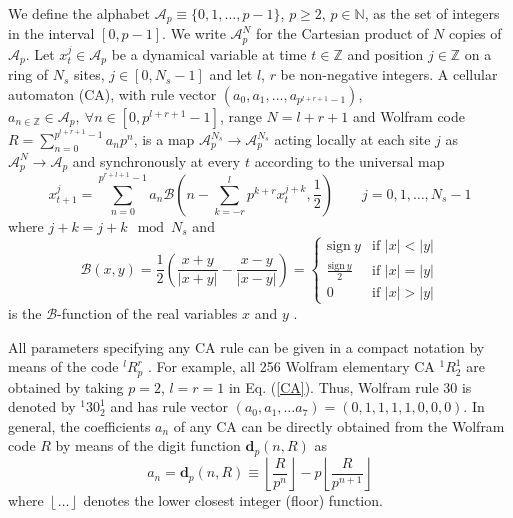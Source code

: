 \documentclass[aps,pre,preprint,floatfix]{revtex4}
\theoremstyle{plain} \newtheorem{defi}{Definition}[section]
\theoremstyle{plain} \newtheorem{prop}{Proposition}[section]
\theoremstyle{plain} \newtheorem{theor}{Theorem}[section]
\theoremstyle{plain} \newtheorem{lemma}{Lemma}[section]
\theoremstyle{plain} \newtheorem*{corol}{Corollary}
\theoremstyle{remark} \newtheorem*{rem}{Remark}
\theoremstyle{plain} \newtheorem{exer}{Exercise}[section]
\theoremstyle{remark} \newtheorem*{ans}{Answer}
\begin{document}
We define the alphabet $\mathcal{A}_{p}\equiv \{0,1,\ldots,p-1\}$, $p\ge 2$, $p\in \mathbb{N}$, as the set of integers in the interval $[0,p-1]$. We write $\mathcal{A}_{p}^{N}$ for the Cartesian product of $N$ copies of $\mathcal{A}_{p}$.  Let $x_{t}^{j}\in \mathcal{A}_{p}$ be a dynamical variable at time $t\in \mathbb{Z}$ and position $j\in \mathbb{Z}$ on a ring of $N_{s}$ sites, $j \in [0,N_{s}-1]$ and let $l$, $r$ be non-negative integers. A cellular automaton (CA), with rule vector $(a_{0},a_{1},\ldots, a_{p^{l+r+1}-1})$, $a_{n\in \mathbb{Z}}\in \mathcal{A}_{p},\ \forall n\in[0,p^{l+r+1}-1]$, range $N=l+r+1$ and Wolfram code $R=\sum_{n=0}^{p^{l+r+1}-1}a_{n}p^{n}$, is a map $\mathcal{A}_{p}^{N_s}\to \mathcal{A}_{p}^{N_s}$ acting locally at each site $j$ as $\mathcal{A}_{p}^{N}\to \mathcal{A}_{p}$ and synchronously at every $t$ according to the universal map \cite{VGM1}
\begin{equation}
x_{t+1}^{j}=\sum_{n=0}^{p^{r+l+1}-1}a_{n}\mathcal{B}\left(n-\sum_{k=-r}^{l}p^{k+r}x_{t}^{j+k},\frac{1}{2}\right) \qquad j=0,1,\ldots, N_{s}-1 \label{CA}
\end{equation} 
where $j+k=j+k \mod N_{s}$ and 
\begin{equation}
\mathcal{B}(x,y)=\frac{1}{2}\left(\frac{x+y}{|x+y|}-\frac{x-y}{|x-y|}\right)={\begin{cases} \text{sign}\ y &{\text{if }} |x| < |y|\\ \frac{\text{sign}\ y}{2}&{\text{if }}|x|=|y| \\0&{\text{if }}|x| > |y| \end{cases}} \label{d1}
\end{equation}
is the $\mathcal{B}$-function of the real variables $x$ and $y$ \cite{VGM1}.  

All parameters specifying any CA rule can be given in a compact notation by means of the code $^{l}R^{r}_{p}$ \cite{VGM1}. For example, all 256 Wolfram elementary CA $^{1}R^{1}_{2}$ are obtained by taking $p=2$, $l=r=1$ in Eq. (\ref{CA}). Thus, Wolfram rule 30 is denoted by $^{1}30^{1}_{2}$ and has rule vector $(a_{0},a_{1},\ldots a_{7})=(0,1,1,1,1,0,0,0)$. In general, the coefficients $a_{n}$ of any CA can be directly obtained from the Wolfram code $R$ by means of the digit function $\mathbf{d}_{p}(n,R)$ \cite{CHAOSOLFRAC, semipredo}  as 
\begin{equation}
a_{n}=\mathbf{d}_{p}(n,R)\equiv \left \lfloor \frac{R}{p^{n}} \right \rfloor-p\left \lfloor \frac{R}{p^{n+1}} \right \rfloor    \label{cucuAreal}
\end{equation}
where $\left \lfloor \ldots \right \rfloor$ denotes the lower closest integer (floor) function. 
\end{document}

